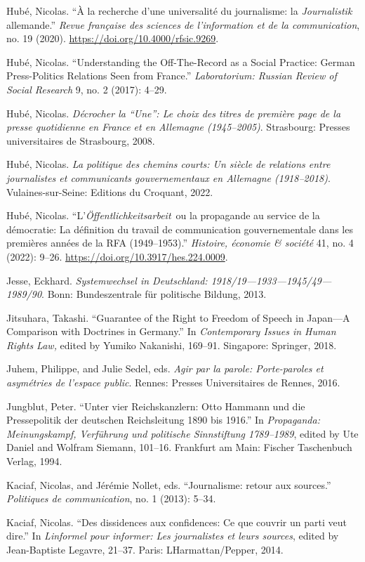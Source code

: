 \documentclass{tufte-handout}
\begin{document}
\begin{hangparas}{.25in}{1}
Hubé, Nicolas. ``À la recherche d'une universalité du journalisme: la
\emph{Journalistik} allemande.'' \emph{Revue française des sciences de
l'information et de la communication}, no. 19 (2020).
\url{https://doi.org/10.4000/rfsic.9269}.

Hubé, Nicolas. ``Understanding the Off-The-Record as a Social Practice:
German Press-Politics Relations Seen from France.'' \emph{Laboratorium:
Russian Review of Social Research} 9, no. 2 (2017): 4--29.

Hubé, Nicolas. \emph{Décrocher la ``Une'': Le choix des titres de
première page de la presse quotidienne en France et en Allemagne
(1945--2005)}. Strasbourg: Presses universitaires de Strasbourg, 2008.

Hubé, Nicolas. \emph{La politique des chemins courts: Un siècle de
relations entre journalistes et communicants gouvernementaux en
Allemagne (1918--2018)}. Vulaines-sur-Seine: Editions du Croquant, 2022.

Hubé, Nicolas. ``L'\emph{Öffentlichkeitsarbeit}~ou la propagande au
service de la démocratie: La définition du travail de communication
gouvernementale dans les premières années de la RFA (1949--1953).''
\emph{Histoire, économie \& société} 41, no. 4 (2022): 9--26.
\url{https://doi.org/10.3917/hes.224.0009}.

Jesse, Eckhard. \emph{Systemwechsel in Deutschland:
1918/19---1933---1945/49---1989/90}. Bonn: Bundeszentrale für politische
Bildung, 2013.

Jitsuhara, Takashi. ``Guarantee of the Right to Freedom of Speech in
Japan---A Comparison with Doctrines in Germany.'' In \emph{Contemporary
Issues in Human Rights Law,} edited by Yumiko Nakanishi, 169--91.
Singapore: Springer, 2018.

Juhem, Philippe, and Julie Sedel, eds. \emph{Agir par la parole:
Porte-paroles et asymétries de l'espace public}. Rennes: Presses
Universitaires de Rennes, 2016.

Jungblut, Peter. ``Unter vier Reichskanzlern: Otto Hammann und die
Pressepolitik der deutschen Reichsleitung 1890 bis 1916.'' In
\emph{Propaganda: Meinungskampf, Verführung und politische Sinnstiftung
1789--1989}, edited by Ute Daniel and Wolfram Siemann, 101--16.
Frankfurt am Main: Fischer Taschenbuch Verlag, 1994.

Kaciaf, Nicolas, and Jérémie Nollet, eds. ``Journalisme: retour aux
sources.'' \emph{Politiques de communication}, no. 1 (2013): 5--34.

Kaciaf, Nicolas. ``Des dissidences aux confidences: Ce que couvrir un
parti veut dire.'' In \emph{L\textquotesingle informel pour informer:
Les journalistes et leurs sources}, edited by Jean-Baptiste Legavre,
21­--37. Paris: L\textquotesingle Harmattan/Pepper, 2014.


\end{hangparas}
\end{document}
